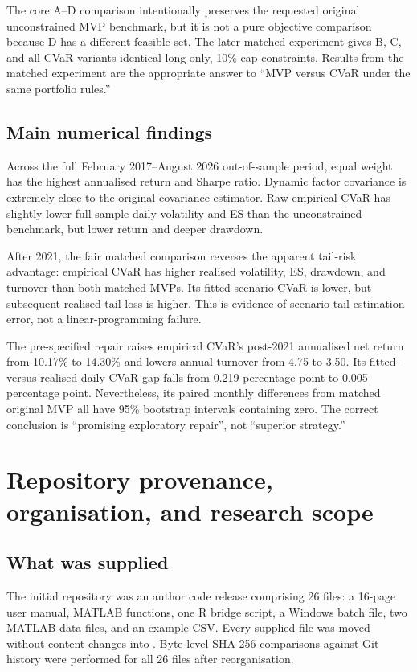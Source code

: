 \documentclass[11pt,a4paper]{article}
\begin{document}
The core A--D comparison intentionally preserves the requested original unconstrained MVP benchmark, but it is not a pure objective comparison because D has a different feasible set. The later matched experiment gives B, C, and all CVaR variants identical long-only, 10\%-cap constraints. Results from the matched experiment are the appropriate answer to ``MVP versus CVaR under the same portfolio rules.''

\subsection{Main numerical findings}

Across the full February 2017--August 2026 out-of-sample period, equal weight has the highest annualised return and Sharpe ratio. Dynamic factor covariance is extremely close to the original covariance estimator. Raw empirical CVaR has slightly lower full-sample daily volatility and ES than the unconstrained benchmark, but lower return and deeper drawdown.

After 2021, the fair matched comparison reverses the apparent tail-risk advantage: empirical CVaR has higher realised volatility, ES, drawdown, and turnover than both matched MVPs. Its fitted scenario CVaR is lower, but subsequent realised tail loss is higher. This is evidence of scenario-tail estimation error, not a linear-programming failure.

The pre-specified repair raises empirical CVaR's post-2021 annualised net return from 10.17\% to 14.30\% and lowers annual turnover from 4.75 to 3.50. Its fitted-versus-realised daily CVaR gap falls from 0.219 percentage point to 0.005 percentage point. Nevertheless, its paired monthly differences from matched original MVP all have 95\% bootstrap intervals containing zero. The correct conclusion is ``promising exploratory repair'', not ``superior strategy.''

\section{Repository provenance, organisation, and research scope}

\subsection{What was supplied}

The initial repository was an author code release comprising 26 files: a 16-page user manual, MATLAB functions, one R bridge script, a Windows batch file, two MATLAB data files, and an example CSV. Every supplied file was moved without content changes into . Byte-level SHA-256 comparisons against Git history were performed for all 26 files after reorganisation.
\end{document}
